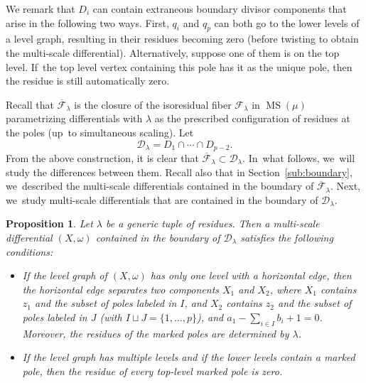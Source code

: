 \documentclass[11pt]{article}
\DeclareMathOperator\MS{MS}
\newtheorem{prop}[thm]{Proposition}
\theoremstyle{definition}
\begin{document}
We remark that $D_i$ can contain extraneous boundary divisor components that arise in the following two ways. First, $q_i$ and $q_p$ can both go to the lower levels of a level graph, resulting in their residues becoming zero (before twisting to obtain the multi-scale differential). Alternatively, suppose one of them is on the top level. If~the top level vertex containing this pole has it as the unique pole, then the residue is still automatically zero.

Recall that $\overline{\mathcal F}_{\lambda}$ is the closure of the isoresidual fiber $\mathcal F_\lambda$ in $\MS(\mu)$ parametrizing differentials with $\lambda$ as the prescribed configuration of residues at the poles (up~to simultaneous scaling). Let\vspace*{-3pt}
\[
\mathcal D_\lambda = D_1\cap \cdots \cap D_{p-2}.
\]
From the above construction, it is clear that
$\overline{\mathcal F}_\lambda\subset \mathcal D_\lambda$. In~what follows, we~will study the differences between them. Recall also that in Section~\ref{sub:boundary}, we~described the multi-scale differentials contained in the boundary of $\overline{\mathcal F}_{\lambda}$. Next, we~study multi-scale differentials that are contained in the boundary of $\mathcal D_\lambda$.

\begin{prop}
\label{prop:boundary}
Let $\lambda$ be a generic tuple of residues.
Then a multi-scale differential $(X,\omega)$ contained in the boundary of $\mathcal D_\lambda$ satisfies the following conditions:
\begin{itemize}
\item If the level graph of $(X,\omega)$ has only one level with a horizontal edge, then the horizontal edge separates two components $X_1$ and $X_2$, where $X_1$ contains $z_1$ and the subset of poles labeled in $I$, and $X_2$ contains $z_2$ and the subset of poles labeled in $J$ (with $I\sqcup J = \{1,\ldots,p\}$), and $a_1 - \sum_{i\in I} b_i + 1 = 0$. Moreover, the residues of the marked poles are determined by $\lambda$.
\item If the level graph has multiple levels and if the lower levels contain a marked pole, then the residue of every top-level marked pole is zero.
\end{itemize}
\end{prop}
\end{document}
